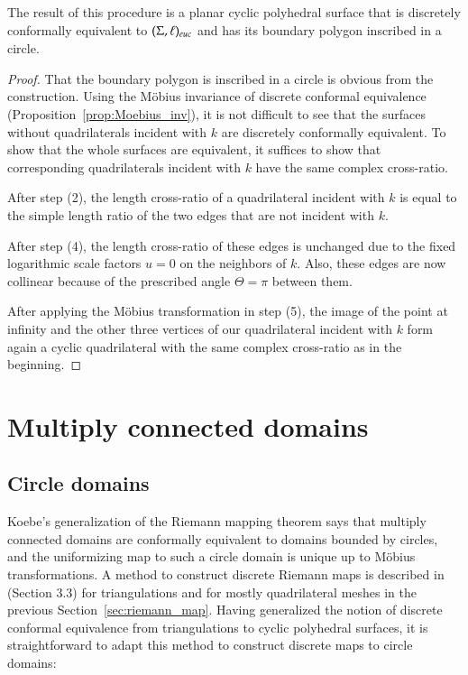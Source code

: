 \documentclass[Thesis]{subfiles}
\begin{document}
\begin{proposition}
  \label{prop:riemann_map}
  The result of this procedure is a planar cyclic polyhedral surface
  that is discretely conformally equivalent to $(\Sigma, \ell)_{\euc}$
  and has its boundary polygon inscribed in a circle.
\end{proposition}

\begin{proof}
  That the boundary polygon is inscribed in a circle is obvious from
  the construction.  Using the M{\"o}bius invariance of discrete
  conformal equivalence (Proposition~\ref{prop:Moebius_inv}), it is
  not difficult to see that the surfaces without quadrilaterals
  incident with $k$ are discretely conformally equivalent. To show
  that the whole surfaces are equivalent, it suffices to show that
  corresponding quadrilaterals incident with $k$ have the same complex
  cross-ratio.

  After step (2), the length cross-ratio of a quadrilateral incident with
  $k$ is equal to the simple length ratio of the two edges that are
  not incident with $k$. 

  After step (4), the length cross-ratio of these edges is unchanged due
  to the fixed logarithmic scale factors $u=0$ on the neighbors of
  $k$. Also, these edges are now collinear because of the prescribed
  angle $\Theta=\pi$ between them.

  After applying the M{\"o}bius transformation in step (5), the image of
  the point at infinity and the other three vertices of our
  quadrilateral incident with $k$ form again a cyclic quadrilateral
  with the same complex cross-ratio as in the beginning.
\end{proof}

\section{Multiply connected domains}
\label{sec:multiply_connected}

\subsection{Circle domains}
\label{sec:circle_domains}

Koebe's generalization of the Riemann mapping theorem says that
multiply connected domains are conformally equivalent to domains
bounded by circles, and the uniformizing map to such a circle domain
is unique up to M{\"o}bius transformations. A method to construct
discrete Riemann maps is described in~\cite{BPS2015:dconf} (Section
3.3) for triangulations and for mostly quadrilateral meshes in
the previous Section~\ref{sec:riemann_map}. Having generalized the
notion of discrete conformal equivalence from triangulations to cyclic
polyhedral surfaces, it is straightforward to adapt this method to
construct discrete maps to circle domains: 
\end{document}
